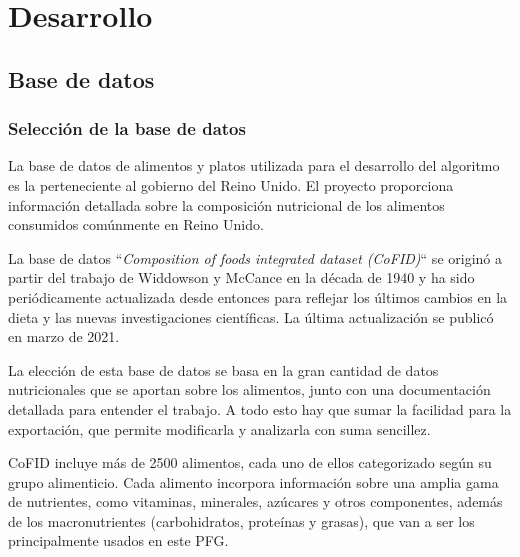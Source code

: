 \chapter{Desarrollo}
\label{ch:desarrollo}


\section{Base de datos}

\subsection{Selección de la base de datos}
La base de datos de alimentos y platos utilizada para el desarrollo del algoritmo es la perteneciente al gobierno del Reino Unido. El proyecto proporciona información detallada sobre la composición nutricional de los alimentos consumidos comúnmente en Reino Unido.~\cite{cofid2021}

La base de datos ``\textit{Composition of foods integrated dataset (CoFID)}`` se originó a partir del trabajo de Widdowson y McCance en la década de 1940 y ha sido periódicamente actualizada desde entonces para reflejar los últimos cambios en la dieta y las nuevas investigaciones científicas. La última actualización se publicó en marzo de 2021.

La elección de esta base de datos se basa en la gran cantidad de datos nutricionales que se aportan sobre los alimentos, junto con una documentación detallada para entender el trabajo. A todo esto hay que sumar la facilidad para la exportación, que permite modificarla y analizarla con suma sencillez.

CoFID incluye más de 2500 alimentos, cada uno de ellos categorizado según su grupo alimenticio. Cada alimento incorpora información sobre una amplia gama de nutrientes, como vitaminas, minerales, azúcares y otros componentes, además de los macronutrientes (carbohidratos, proteínas y grasas), que van a ser los principalmente usados en este PFG.

